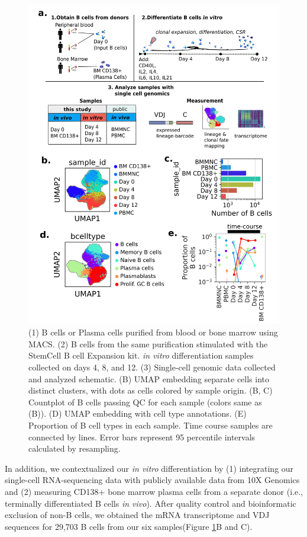 \begin{figure}[hbt!]
\centering
\includegraphics[width=12cm, keepaspectratio]{figs/InVitro/fig1_bcd.png}
\caption[Experimental overview for studying \textit{in vitro} B cell dynamics using integrated single-cell genomics and lineage tracing.]{(1) B cells or Plasma cells purified from blood or bone marrow using MACS. (2) B cells from the same purification stimulated with the StemCell B cell Expansion kit. \textit{in vitro} differentiation samples collected on days 4, 8, and 12. (3) Single-cell genomic data collected and analyzed schematic. (B) UMAP embedding separate cells into distinct clusters, with dots as cells colored by sample origin. (B, C) Countplot of B cells passing QC for each sample (colors same as (B)). (D) UMAP embedding with cell type annotations. (E) Proportion of B cell types in each sample. Time course samples are connected by lines. Error bars represent 95 percentile intervals calculated by resampling.}
\label{fig:paper2_fig_1}
\end{figure}
In addition, we contextualized our \textit{in vitro} differentiation by (1) integrating our single-cell RNA-sequencing data with publicly available data from 10X Genomics and (2) measuring CD138+ bone marrow plasma cells from a separate donor (i.e., terminally differentiated B cells \textit{in vivo}). After quality control and bioinformatic exclusion of non-B cells, we obtained the mRNA transcriptome and VDJ sequences for 29,703 B cells from our six samples(Figure \ref{fig:paper2_fig_1}B and C).
